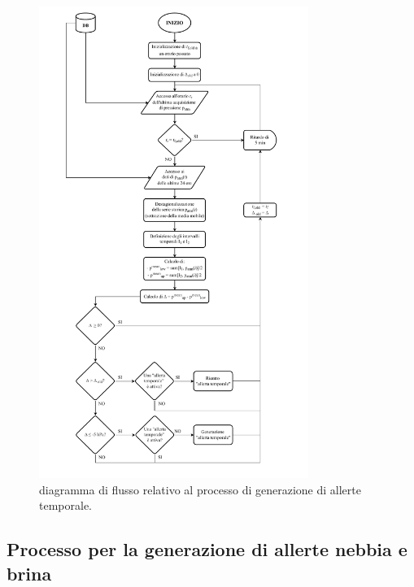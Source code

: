 \begin{figure}[h!]
	\centering
	\includegraphics[height=580px]{FlowChartsFiles/Allerta_temporale.pdf}
	\caption[Diagramma di flusso relativo al processo di generazione di allerte temporale]{diagramma di flusso relativo al processo di generazione di allerte temporale.}
	\label{Allerta_temporale}
\end{figure}

\subsection{Processo per la generazione di allerte nebbia e brina}

